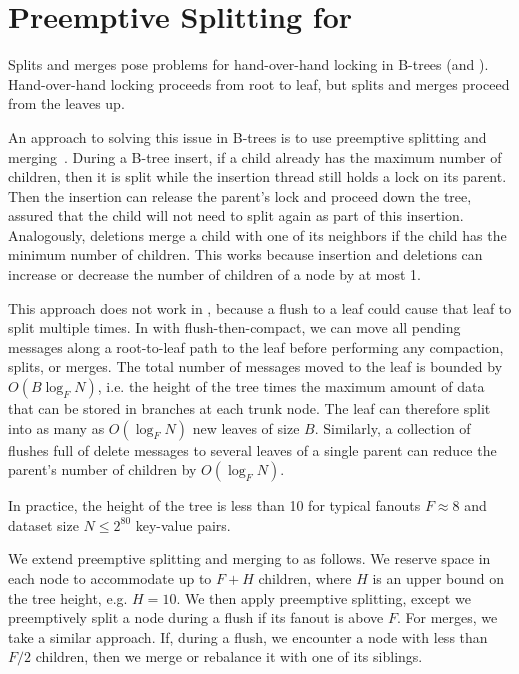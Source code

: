 \section{Preemptive Splitting for \datastructs}
\label{sec:splitting}

Splits and merges pose problems for hand-over-hand locking in B-trees
(and \bets).  Hand-over-hand locking proceeds from root to leaf, but
splits and merges proceed from the leaves up.

An approach to solving this issue in B-trees is to use preemptive
splitting and merging~\cite{Rodeh08}.  During a B-tree insert, if a
child already has the maximum number of children, then it is split
while the insertion thread still holds a lock on its parent.  Then the
insertion can release the parent's lock and proceed down the tree,
assured that the child will not need to split again as part of this
insertion.  Analogously, deletions merge a child with one of its
neighbors if the child has the minimum number of children.  This works
because insertion and deletions can increase or decrease
the number of children of a node by at most 1.

This approach does not work in \bets, because a flush to a leaf could
cause that leaf to split multiple times.  In \datastruct with
flush-then-compact, we can move all pending messages along a
root-to-leaf path to the leaf before performing any compaction,
splits, or merges.  The total number of messages moved to the leaf is
bounded by $O(B\log_F N)$, i.e. the height of the tree times the
maximum amount of data that can be stored in branches at each trunk
node.  The leaf can therefore split into as many as $O(\log_F
N)$ new leaves of size $B$.  Similarly, a collection of flushes full
of delete messages to several leaves of a single parent can reduce the
parent's number of children by $O(\log_F N)$.

In practice, the height of the tree is less than 10 for typical
fanouts $F\approx 8$ and dataset size $N\leq 2^{80}$ key-value
pairs.

We extend preemptive splitting and merging to \datastructs as follows.
We reserve space in each node to accommodate up to $F + H$
children, where $H$ is an upper bound on the tree height, e.g. $H=10$.
We then apply preemptive splitting, except we preemptively split a
node during a flush if its fanout is above $F$.  For merges, we
take a similar approach.  If, during a flush, we encounter a node with
less than $F/2$ children, then we merge or rebalance it with one
of its siblings.

